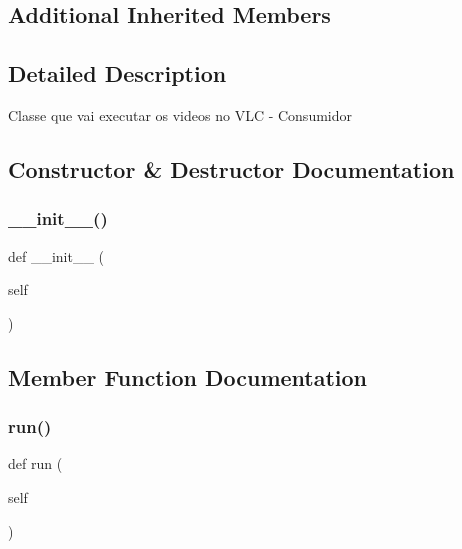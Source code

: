 \subsection*{Additional Inherited Members}


\subsection{Detailed Description}
\begin{DoxyVerb}Classe que vai executar os videos no VLC - Consumidor\end{DoxyVerb}
 

\subsection{Constructor \& Destructor Documentation}
\mbox{\label{class_client_1_1_player_auto_ae64f0875afe3067b97ba370b354b9213}} 
\subsubsection{\texorpdfstring{\+\_\+\+\_\+init\+\_\+\+\_\+()}{\_\_init\_\_()}}
{\footnotesize\ttfamily def \+\_\+\+\_\+init\+\_\+\+\_\+ (\begin{DoxyParamCaption}\item[{}]{self }\end{DoxyParamCaption})}



\subsection{Member Function Documentation}
\mbox{\label{class_client_1_1_player_auto_ad22709b2e67308af35f55680d5a026e0}} 
\subsubsection{\texorpdfstring{run()}{run()}}
{\footnotesize\ttfamily def run (\begin{DoxyParamCaption}\item[{}]{self }\end{DoxyParamCaption})}

